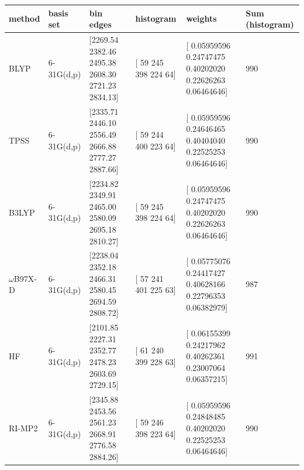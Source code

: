 \begin{table}[h]
  \centering
  \caption{Weights and bin counts for each quantum chemical method and basis set, 0 QM/256 MM. Weights from B3LYP/6-31(d,p) are used for selecting the structures for box size dependence and SAPT calculations.}
  \label{paper_02:tab:S2}
  \begin{longtable}[]{@{}llllll@{}}
    \toprule
    \begin{minipage}[b]{0.16\columnwidth}\raggedright
      \textbf{method}\strut
    \end{minipage} & \begin{minipage}[b]{0.16\columnwidth}\raggedright
      \textbf{basis set}\strut
    \end{minipage} & \begin{minipage}[b]{0.16\columnwidth}\raggedright
      \textbf{bin edges}\strut
    \end{minipage} & \begin{minipage}[b]{0.16\columnwidth}\raggedright
      \textbf{histogram}\strut
    \end{minipage} & \begin{minipage}[b]{0.16\columnwidth}\raggedright
      \textbf{weights}\strut
    \end{minipage} & \begin{minipage}[b]{0.16\columnwidth}\raggedright
      \textbf{Sum (histogram)}\strut
    \end{minipage}\tabularnewline
    \midrule
    \endhead
    BLYP & 6-31G(d,p) & {[}2269.54 2382.46 2495.38 2608.30 2721.23 2834.13{]} & {[} 59 245 398 224 64{]} & {[} 0.05959596 0.24747475 0.40202020 0.22626263 0.06464646{]} & 990\tabularnewline
    TPSS & 6-31G(d,p) & {[}2335.71 2446.10 2556.49 2666.88 2777.27 2887.66{]} & {[} 59 244 400 223 64{]} & {[} 0.05959596 0.24646465 0.40404040 0.22525253 0.06464646{]} & 990\tabularnewline
    B3LYP & 6-31G(d,p) & {[}2234.82 2349.91 2465.00 2580.09 2695.18 2810.27{]} & {[} 59 245 398 224 64{]} & {[} 0.05959596 0.24747475 0.40202020 0.22626263 0.06464646{]} & 990\tabularnewline
    \(\omega\)B97X-D & 6-31G(d,p) & {[}2238.04 2352.18 2466.31 2580.45 2694.59 2808.72{]} & {[} 57 241 401 225 63{]} & {[} 0.05775076 0.24417427 0.40628166 0.22796353 0.06382979{]} & 987\tabularnewline
    HF & 6-31G(d,p) & {[}2101.85 2227.31 2352.77 2478.23 2603.69 2729.15{]} & {[} 61 240 399 228 63{]} & {[} 0.06155399 0.24217962 0.40262361 0.23007064 0.06357215{]} & 991\tabularnewline
    RI-MP2 & 6-31G(d,p) & {[}2345.88 2453.56 2561.23 2668.91 2776.58 2884.26{]} & {[} 59 246 398 223 64{]} & {[} 0.05959596 0.24848485 0.40202020 0.22525253 0.06464646{]} & 990\tabularnewline

\end{longtable}
\end{table}
